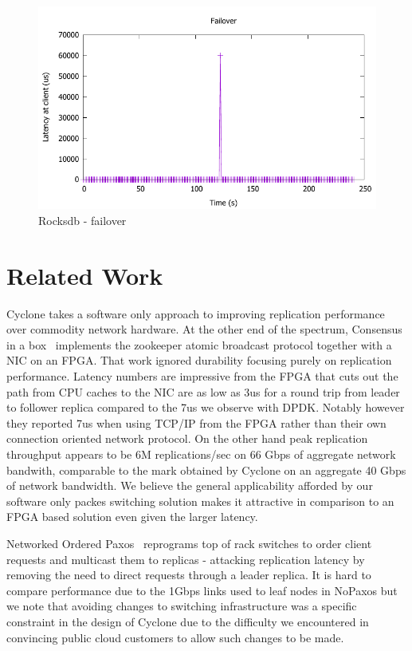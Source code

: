 \documentclass[10pt, preprint, nonatbib]{sigplanconf}
\begin{document}
\begin{figure}
\includegraphics[scale=0.6]{results2/failover.pdf}
\caption{Rocksdb - failover}
\label{fig:timeline}
\end{figure}

\section{Related Work}

Cyclone takes a software only approach to improving replication performance over
commodity network hardware. At the other end of the spectrum, Consensus in a
box~\cite{consensus_box} implements the zookeeper atomic broadcast protocol
together with a NIC on an FPGA. That work ignored durability focusing purely on
replication performance. Latency numbers are impressive from the FPGA that cuts
out the path from CPU caches to the NIC are as low as 3us for a round trip from
leader to follower replica compared to the 7us we observe with DPDK. Notably
however they reported 7us when using TCP/IP from the FPGA rather than their own
connection oriented network protocol. On the other hand peak replication
throughput appears to be 6M replications/sec on 66 Gbps of aggregate network
bandwith, comparable to the mark obtained by Cyclone on an aggregate 40 Gbps of
network bandwidth. We believe the general applicability afforded by our software
only packes switching solution makes it attractive in comparison to an FPGA
based solution even given the larger latency.

Networked Ordered Paxos~\cite{nopaxos} reprograms top of rack switches to order
client requests and multicast them to replicas - attacking replication latency
by removing the need to direct requests through a leader replica. It is hard to
compare performance due to the 1Gbps links used to leaf nodes in NoPaxos but we
note that avoiding changes to switching infrastructure was a specific constraint
in the design of Cyclone due to the difficulty we encountered in convincing
public cloud customers to allow such changes to be made.
\end{document}
